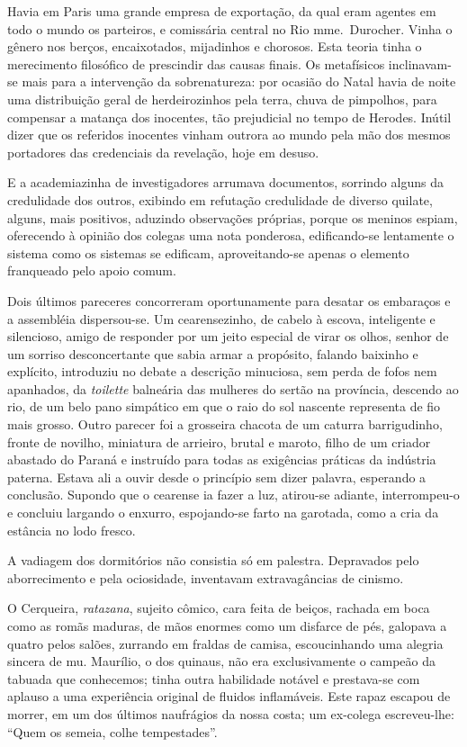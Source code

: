 Havia em Paris uma grande empresa de exportação, da qual eram agentes
em todo o mundo os parteiros, e comissária central no Rio mme.~Durocher. 
Vinha o gênero nos berços, encaixotados, mijadinhos e chorosos. Esta teoria 
tinha o merecimento filosófico de prescindir das causas finais. Os metafísicos
inclinavam{}-se mais para a intervenção da sobrenatureza: por ocasião
do Natal havia de noite uma distribuição geral de herdeirozinhos pela
terra, chuva de pimpolhos, para compensar a matança dos inocentes, tão
prejudicial no tempo de Herodes. Inútil dizer que os referidos
inocentes vinham outrora ao mundo pela mão dos mesmos portadores das
credenciais da revelação, hoje em desuso. 

E a academiazinha de
investigadores arrumava documentos, sorrindo alguns da credulidade dos
outros, exibindo em refutação credulidade de diverso quilate, alguns,
mais positivos, aduzindo observações próprias, porque os meninos
espiam, oferecendo à opinião dos colegas uma nota ponderosa,
edificando{}-se lentamente o sistema como os sistemas se edificam,
aproveitando{}-se apenas o elemento franqueado pelo apoio comum. 

Dois últimos pareceres concorreram oportunamente para desatar os embaraços e
a assembléia dispersou{}-se. Um cearensezinho, de cabelo à escova,
inteligente e silencioso, amigo de responder por um jeito especial de
virar os olhos, senhor de um sorriso desconcertante que sabia armar a
propósito, falando baixinho e explícito, introduziu no debate a
descrição minuciosa, sem perda de fofos nem apanhados, da \textit{toilette}
balneária das mulheres do sertão na província, descendo ao rio, de um
belo pano simpático em que o raio do sol nascente representa de fio
mais grosso. Outro parecer foi a grosseira chacota de um caturra
barrigudinho, fronte de novilho, miniatura de arrieiro, brutal e
maroto, filho de um criador abastado do Paraná e instruído para todas
as exigências práticas da indústria paterna. Estava ali a ouvir desde o
princípio sem dizer palavra, esperando a conclusão. Supondo que o
cearense ia fazer a luz, atirou{}-se adiante, interrompeu{}-o e
concluiu largando o enxurro, espojando{}-se farto na garotada, como a
cria da estância no lodo fresco. 

A vadiagem dos dormitórios não
consistia só em palestra. Depravados pelo aborrecimento e pela
ociosidade, inventavam extravagâncias de cinismo. 

O Cerqueira, \textit{ratazana}, sujeito cômico, cara feita de beiços, rachada em boca como as
romãs maduras, de mãos enormes como um disfarce de pés, galopava a
quatro pelos salões, zurrando em fraldas de camisa, escoucinhando uma
alegria sincera de mu. Maurílio, o dos quinaus, não era exclusivamente
o campeão da tabuada que conhecemos; tinha outra habilidade notável e
prestava{}-se com aplauso a uma experiência original de fluidos
inflamáveis. Este rapaz escapou de morrer, em um dos últimos naufrágios
da nossa costa; um ex{}-colega escreveu{}-lhe: ``Quem os semeia, colhe
tempestades''. 

